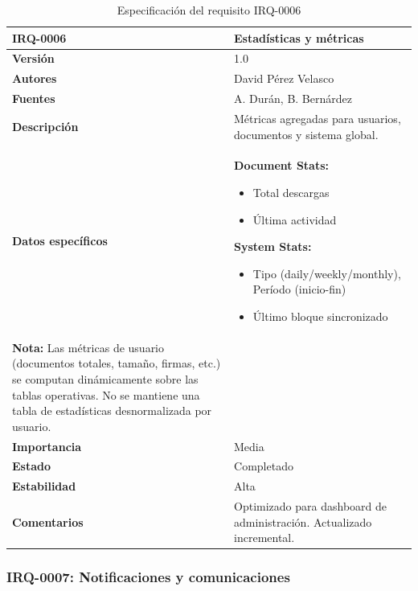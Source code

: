 \documentclass[11pt, a4paper]{article}
\begin{document}
\begin{table}[H]
    \centering
    \small
    \begin{tabular}{|p{4cm}|p{10cm}|}
    \hline
    \textbf{IRQ-0006} & Estadísticas y métricas \\
    \hline
    \textbf{Versión} & 1.0 \\
    \hline
    \textbf{Autores} & David Pérez Velasco \\
    \hline
    \textbf{Fuentes} & A. Durán, B. Bernárdez \\
    \hline
    \textbf{Descripción} & Métricas agregadas para usuarios, documentos y sistema global. \\
    \hline
    \textbf{Datos específicos} & 
    \textbf{Document Stats:}
    \begin{itemize}
        \item Total descargas
        \item Última actividad
    \end{itemize}
    
    \textbf{System Stats:}
    \begin{itemize}
        \item Tipo (daily/weekly/monthly), Período (inicio-fin)
        \item Último bloque sincronizado
    \end{itemize} \\
    
    \textbf{Nota:} Las métricas de usuario (documentos totales, tamaño, firmas, etc.) se computan dinámicamente sobre las tablas operativas. No se mantiene una tabla de estadísticas desnormalizada por usuario. \\
    \hline
    \textbf{Importancia} & Media \\
    \hline
    \textbf{Estado} & Completado \\
    \hline
    \textbf{Estabilidad} & Alta \\
    \hline
    \textbf{Comentarios} & Optimizado para dashboard de administración. Actualizado incremental. \\
    \hline
    \end{tabular}
    \caption{Especificación del requisito IRQ-0006}
\end{table}

\subsubsection{IRQ-0007: Notificaciones y comunicaciones}
\end{document}
